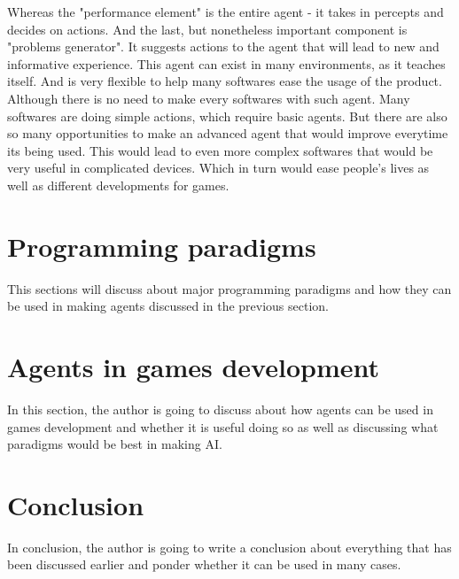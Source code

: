 \documentclass{scrartcl}
\begin{document}
Whereas the "performance element" is the entire agent - it takes in percepts and decides on actions.
And the last, but nonetheless important component is "problems generator".
It suggests actions to the agent that will lead to new and informative experience.
This agent can exist in many environments, as it teaches itself.
And is very flexible to help many softwares ease the usage of the product.
Although there is no need to make every softwares with such agent.
Many softwares are doing simple actions, which require basic agents.
But there are also so many opportunities to make an advanced agent that would improve everytime its being used.
This would lead to even more complex softwares that would be very useful in complicated devices.
Which in turn would ease people's lives as well as different developments for games.

\section{Programming paradigms}
This sections will discuss about major programming paradigms and how they can be used in making agents discussed in the previous section.

\section{Agents in games development}
In this section, the author is going to discuss about how agents can be used in games development and whether it is useful doing so as well as discussing what paradigms would be best in making AI.

\section{Conclusion}
In conclusion, the author is going to write a conclusion about everything that has been discussed earlier and ponder whether it can be used in many cases.

\nocite{*}



\end{document}
